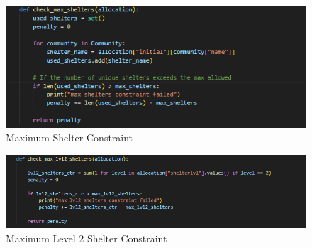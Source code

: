 \begin{appendices}
\begin{centerappendixtitle}
		\begin{figure}[h]
			\centering
			\caption{Maximum Shelter Constraint}
			\label{maxshelCode}
			\includegraphics[width=\linewidth]{appendix/max shel const}
		\end{figure}
		
		\begin{figure}[h]
			\centering
			\caption{Maximum Level 2 Shelter Constraint}
			\label{maxl2shelCode}
			\includegraphics[width=\linewidth]{appendix/max lvl2 shel const}
		\end{figure}
		
		
	\end{centerappendixtitle}
	
	
	
\end{appendices}